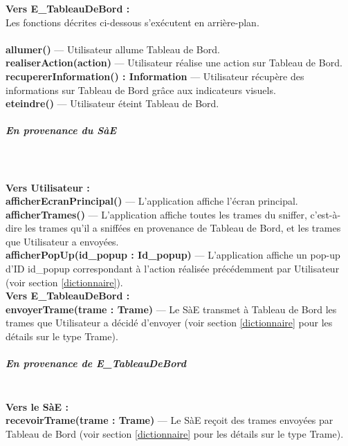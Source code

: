 \textbf{Vers E\_TableauDeBord :} \vspace{0.2cm} \\ %
Les fonctions décrites ci-dessous s'exécutent en arrière-plan. \\
\\
\textbf{allumer()} --- Utilisateur allume Tableau de Bord. \\
\textbf{realiserAction(action)} --- Utilisateur réalise une action sur Tableau de Bord. \\
\textbf{recupererInformation() : Information} --- Utilisateur récupère des informations sur Tableau de Bord grâce aux indicateurs visuels. \\
\textbf{eteindre()} --- Utilisateur éteint Tableau de Bord.

\subparagraph{En provenance du SàE}
\mbox{}\\\\
\textbf{Vers Utilisateur :} \vspace{0.2cm} \\ %
\textbf{afficherEcranPrincipal()} --- L'application {\nomApplication} affiche l'écran principal. \\
\textbf{afficherTrames()} --- L'application {\nomApplication} affiche toutes les trames du sniffer, c'est-à-dire les trames qu'il a sniffées en provenance de Tableau de Bord, et les trames que Utilisateur a envoyées.  \\
\textbf{afficherPopUp(id\_popup : Id\_popup)} --- L'application {\nomApplication} affiche un pop-up d'ID id\_popup correspondant à l'action réalisée précédemment par Utilisateur (voir section \ref{dictionnaire}). \\

\textbf{Vers E\_TableauDeBord :} \vspace{0.2cm} \\ %
\textbf{envoyerTrame(trame : Trame)} --- Le SàE transmet à Tableau de Bord les trames que Utilisateur a décidé d'envoyer (voir section \ref{dictionnaire} pour les détails sur le type Trame).
\subparagraph{En provenance de E\_TableauDeBord}
\mbox{}\\

\textbf{Vers le SàE :} \vspace{0.2cm} \\ %
\textbf{recevoirTrame(trame : Trame)} --- Le SàE reçoit des trames envoyées par Tableau de Bord (voir section \ref{dictionnaire} pour les détails sur le type Trame).

